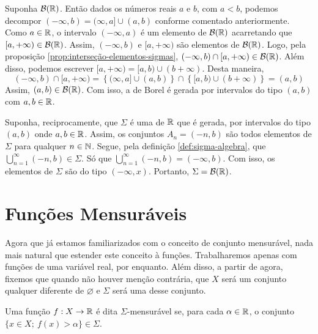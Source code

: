 \begin{prova}
   Suponha $\operatorname{\mathcal{B}(\mathbb{R})}$. 
   Então dados os números reais $a$ e $b$, com $a<b$, podemos decompor $(-\infty, b) = (\infty, a] \cup (a,b)$ conforme comentado anteriormente.
   Como $a \in \mathbb{R}$, o intervalo $(-\infty,a)$ é um elemento de $\operatorname{\mathcal{B}(\mathbb{R})}$ acarretando que $[a, +\infty) \in \operatorname{\mathcal{B}(\mathbb{R})}$. 
   Assim,  $(-\infty, b)$ e $[a, +\infty)$ são elementos de $\operatorname{\mathcal{B}(\mathbb{R})}$.
   Logo, pela proposição \ref{prop:interseção-elementos-sigmas},  $(-\infty, b)\cap [a, +\infty) \in \operatorname{\mathcal{B}(\mathbb{R})}$. 
   Além disso, podemos escrever $[a, +\infty) = [a, b) \cup (b+\infty)$.
   Desta maneira, 
$$
(-\infty, b)\cap [a, +\infty) 
= \left\{(\infty, a] \cup (a,b)\right\} \cap \left\{[a, b) \cup (b+\infty)\right\}
= (a,b)
$$
Assim, $(a,b) \in \operatorname{\mathcal{B}(\mathbb{R})}$. 
Com isso, a \sigal de Borel é gerada por intervalos do tipo $(a,b)$ com $a,b \in \mathbb{R}$.

Suponha, reciprocamente, que $\Sigma$ é uma \sigal de $\mathbb{R}$ que é gerada, por intervalos do tipo $(a,b)$ onde $a,b \in \mathbb{R}$.
Assim, os conjuntos $A_n = (-n, b)$ são todos elementos de $\Sigma$ para qualquer $n \in \operatorname{\mathbb{N}}$.
Segue, pela definição \ref{def:sigma-algebra}, que 
$\displaystyle \bigcup_{n = 1}^\infty (-n,b) \in \Sigma$.
Só que $\displaystyle \bigcup_{n = 1}^\infty (-n,b) = (-\infty, b)$.
Com isso, os elementos de $\Sigma$ são do tipo $(-\infty, x)$.
Portanto, $\Sigma = \operatorname{\mathcal{B}(\mathbb{R})}$.

\end{prova}

\section{Funções Mensuráveis}


Agora que já estamos familiarizados com o conceito de conjunto mensurável, nada mais natural que estender este conceito à funções. Trabalharemos apenas com funções de uma variável real, por enquanto.
Além disso, a partir de agora, fixemos que quando não houver menção contrária,  que $X$ será um conjunto qualquer diferente de $\varnothing$ e $\Sigma$ será uma \sigal desse conjunto. 

\begin{definition}
    Uma função $f: X \to \mathbb{R} $ é dita $\Sigma$-mensurável se, para cada $\alpha \in \mathbb{R}$, o conjunto $\{x \in X;\ f(x) > \alpha\} \in \Sigma$.
\end{definition}


